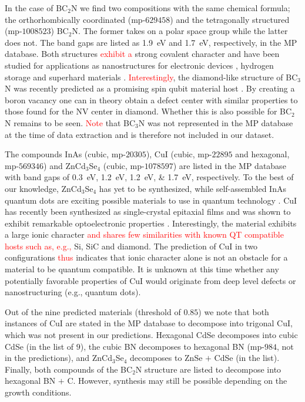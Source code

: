 \documentclass[superscriptaddress,unsortedaddress,
 amsmath,amssymb,
 aps,
]{revtex4-2}
\newcommand{\mrk}[1]{\textcolor{red}{#1}}
\begin{document}
In the case of BC$_2$N we find two compositions with the same chemical formula; the orthorhombically coordinated (mp-$629458$) and the tetragonally structured (mp-$1008523$) BC$_2$N. The former takes on a polar space group while the latter does not. The band gaps are listed as \SI{1.9}{\electronvolt} and \SI{1.7}{\electronvolt}, respectively, in the MP database. Both structures \mrk{exhibit a} strong covalent character and have been studied for applications as nanostructures for electronic devices \cite{Gao2017}, hydrogen storage \cite{Cai2017} and superhard materials \cite{Li2017, Jiang2020}. \mrk{Interestingly}, the diamond-like structure of BC$_3$N was recently predicted as a promising  spin qubit material host \cite{Wang2020SpinQB}. By creating a boron vacancy one can in theory obtain a defect center with similar properties to those found for the NV center in diamond. Whether this is also possible for BC$_2$N remains to be seen. \mrk{Note} that BC$_3$N was not represented in the MP database at the time of data extraction and is therefore not included in our dataset. 

The compounds InAs (cubic, mp-$20305$), CuI (cubic, mp-$22895$ and hexagonal, mp-$569346$) and ZnCd$_3$Se$_4$ (cubic, mp-$1078597$) are listed in the MP database with band gaps of \SIlist{0.3;1.2;1.2;1.7}{\electronvolt}, respectively. 
To the best of our knowledge, ZnCd$_3$Se$_4$ has yet to be synthesized, while self-assembled InAs quantum dots are  exciting possible materials to use in quantum technology \cite{Liu2018}. 
CuI has recently been synthesized as single-crystal epitaxial films and was shown to exhibit remarkable optoelectronic properties \cite{Ahn2020}. Interestingly, the material exhibits a large ionic character 
\mrk{and shares few similarities with known QT compatible hosts such as, e.g.,} Si, SiC and  diamond. The prediction of CuI in two configurations \mrk{thus} indicates that ionic character alone is not an obstacle for a material to be quantum compatible. It is unknown at this time whether any potentially favorable properties of CuI would originate from deep level defects or  nanostructuring (e.g., quantum dots). %

Out of the nine predicted materials (threshold of $0.85$) we note that both instances of CuI are stated in the MP database to decompose into trigonal CuI, which was not present in our predictions. Hexagonal CdSe decomposes into cubic CdSe (in the list of $9$), the cubic BN decomposes to hexagonal BN (mp-$984$, not in the predictions), and ZnCd$_3$Se$_4$ decomposes to ZnSe $+$ CdSe (in the list). Finally, both compounds of the BC$_2$N structure are listed to decompose into hexagonal BN $+$ C. 
However, synthesis may still be possible depending on the growth conditions. 
\end{document}
